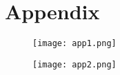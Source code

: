 \documentclass[twoside,11pt]{article}
\begin{document}
\appendix
\section*{Appendix}

\begin{figure}[htbp]
  \centering 
  \texttt{[image: app1.png]} 
  \label{fig:6} 
\end{figure} 

\begin{figure}[htbp]
  \centering 
  \texttt{[image: app2.png]} 
  \label{fig:6} 
\end{figure} 
\end{document}
